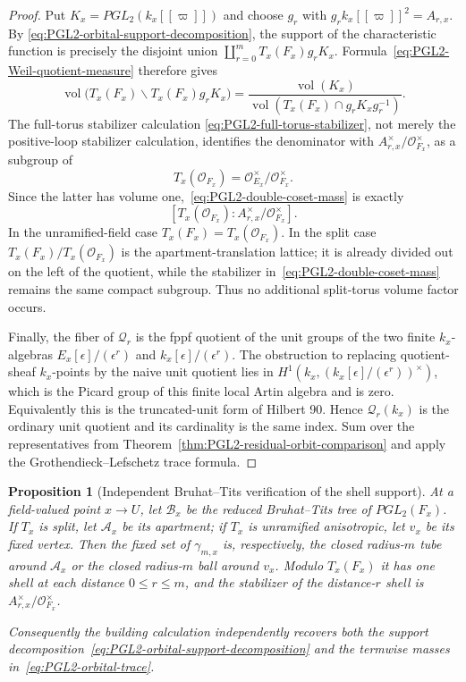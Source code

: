 \documentclass[11pt]{article}
\newtheorem{proposition}[theorem]{Proposition}
\theoremstyle{definition}
\theoremstyle{remark}
\begin{document}
\begin{proof}
Put $K_x=PGL_2(k_x[[\varpi]])$ and choose $g_r$ with
$g_rk_x[[\varpi]]^2=A_{r,x}$.  By
\eqref{eq:PGL2-orbital-support-decomposition}, the support of the
characteristic function is precisely the disjoint union
$\coprod_{r=0}^mT_x(F_x)g_rK_x$.  Formula~\eqref{eq:PGL2-Weil-quotient-measure}
therefore gives
\begin{equation}
 \operatorname{vol}\bigl(T_x(F_x)\backslash
 T_x(F_x)g_rK_x\bigr)
 =\frac{\operatorname{vol}(K_x)}
 {\operatorname{vol}(T_x(F_x)\cap g_rK_xg_r^{-1})}.
 \label{eq:PGL2-double-coset-mass}
\end{equation}
The full-torus stabilizer calculation
\eqref{eq:PGL2-full-torus-stabilizer}, not merely the positive-loop
stabilizer calculation, identifies the denominator with
$A_{r,x}^\times/\mathcal O_{F_x}^\times$, as a subgroup of
\[
 T_x(\mathcal O_{F_x})
 =\mathcal O_{E_x}^\times/\mathcal O_{F_x}^\times.
\]
Since the latter has volume one,~\eqref{eq:PGL2-double-coset-mass} is exactly
\[
 [T_x(\mathcal O_{F_x}):
   A_{r,x}^\times/\mathcal O_{F_x}^\times].
\]
In the unramified-field case $T_x(F_x)=T_x(\mathcal O_{F_x})$.  In the split
case $T_x(F_x)/T_x(\mathcal O_{F_x})$ is the apartment-translation lattice;
it is already divided out on the left of the quotient, while the stabilizer
in~\eqref{eq:PGL2-double-coset-mass} remains the same compact subgroup.
Thus no additional split-torus volume factor occurs.

Finally, the fiber of $\mathscr Q_r$ is the fppf quotient of the unit groups
of the two finite $k_x$-algebras
$E_x[\epsilon]/(\epsilon^r)$ and
$k_x[\epsilon]/(\epsilon^r)$.  The obstruction to replacing quotient-sheaf
$k_x$-points by the naive unit quotient lies in
$H^1(k_x,(k_x[\epsilon]/(\epsilon^r))^\times)$, which is the Picard group of
this finite local Artin algebra and is zero.  Equivalently this is the
truncated-unit form of Hilbert 90.  Hence
$\mathscr Q_r(k_x)$ is the ordinary unit quotient and its cardinality is the
same index.  Sum over the representatives from
Theorem~\ref{thm:PGL2-residual-orbit-comparison} and apply the
Grothendieck--Lefschetz trace formula.
\end{proof}

\begin{proposition}[Independent Bruhat--Tits verification of the shell support]
\label{prop:PGL2-building-shell-verification}
At a field-valued point $x\to U$, let $\mathcal B_x$ be the reduced
Bruhat--Tits tree of $PGL_2(F_x)$.  If $T_x$ is split, let $\mathcal A_x$ be
its apartment; if $T_x$ is unramified anisotropic, let $v_x$ be its fixed
vertex.  Then the fixed set of $\gamma_{m,x}$ is, respectively, the closed
radius-$m$ tube around $\mathcal A_x$ or the closed radius-$m$ ball around
$v_x$.  Modulo $T_x(F_x)$ it has one shell at each distance
$0\le r\le m$, and the stabilizer of the distance-$r$ shell is
$A_{r,x}^{\times}/\mathcal O_{F_x}^{\times}$.

Consequently the building calculation independently recovers both the
support decomposition~\eqref{eq:PGL2-orbital-support-decomposition} and the
termwise masses in~\eqref{eq:PGL2-orbital-trace}.
\end{proposition}
\end{document}
